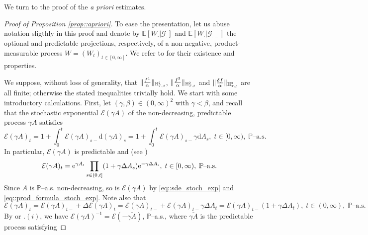 \documentclass[10pt]{article} %
\newcommand\cE{\mathcal E}
\newcommand\cG{\mathcal G}
\newcommand{\smalltext}[1]{\text{\fontsize{4}{4}\selectfont$#1$}}
\def \E{\mathbb{E}}
\def \H{\mathbb{H}}
\def \P{\mathbb{P}}
\newcommand{\1}{\mathbf{1}}
\def\d{\mathrm{d}}
\begin{document}
\medskip
We turn to the proof of the \emph{a priori} estimates.

\begin{proof}[Proof of Proposition \ref{prop::apriori}]\label{proof::apriori}
	To ease the presentation, let us abuse notation sligthly in this proof and denote by $\E[W_\cdot|\cG_\cdot]$ and $\E[W_\cdot|\cG_{\cdot-}]$ the optional and predictable projections, respectively, of a non-negative, product-measurable process $W = (W_t)_{t \in [0,\infty]}$. We refer to \cite[Section VI.2 and Appendix I]{dellacherie1982probabilities} for their existence and properties.
	
	\medskip
	We suppose, without loss of generality, that $\| \frac{f^1}{\alpha}\|_{\H^{\smalltext{2}}_{\smalltext{T}\smalltext{,}\smalltext{\beta}}}$, $\| \frac{f^2}{\alpha}\|_{\H^{\smalltext{2}}_{\smalltext{T}\smalltext{,}\smalltext{\beta}}}$ and $\| \frac{\delta f}{\alpha}\|_{\H^{\smalltext{2}}_{\smalltext{T}\smalltext{,}\smalltext{\beta}}}$ are all finite; otherwise the stated inequalities trivially hold. We start with some introductory calculations. First, let $(\gamma,\beta) \in (0,\infty)^2$ with $\gamma < \beta$, and recall that the stochastic exponential $\cE(\gamma A)$ of the non-decreasing, predictable process $\gamma A$ satisfies
\begin{equation}\label{eq::sde_stoch_exp}
	\cE(\gamma A)_t = 1 + \int_0^t \cE(\gamma A)_{s-}  \d (\gamma A)_s = 1 + \int_0^t \cE(\gamma A)_{s-} \gamma \d A_s, \; t \in [0,\infty), \; \text{$\P$--a.s.}
\end{equation}
In particular, $\cE(\gamma A)$ is predictable and (see \cite[page 134]{jacod2003limit})
\begin{equation}\label{eq::prod_formula_stoch_exp}
	\displaystyle \cE(\gamma A)_t = \mathrm{e}^{\gamma A_\smalltext{t}} \prod_{s \in (0,t]}(1+\gamma\Delta A_s)\mathrm{e}^{-\gamma\Delta A_\smalltext{s}}, \; t \in [0,\infty), \; \text{$\P$--a.s.}
\end{equation}
Since $A$ is $\P$--a.s. non-decreasing, so is $\cE(\gamma A)$ by \eqref{eq::sde_stoch_exp} and \eqref{eq::prod_formula_stoch_exp}. Note also that
\begin{equation}\label{eq::jump_stoch_exp}
	\cE(\gamma A)_t = \cE(\gamma A)_{t-} + \Delta\cE(\gamma A)_t = \cE(\gamma A)_{t-} + \cE(\gamma A)_{t-}\gamma\Delta A_t = \cE(\gamma A)_{t-}(1+\gamma\Delta A_t), \; t \in (0,\infty), \; \text{$\P$--a.s.}
\end{equation}
By \cite[Lemma 4.4]{cohen2012existence} or .$(i)$, we have $\cE(\gamma A)^{-1} = \cE(-\overline{\gamma A})$, $\P$--a.s., where $\overline{\gamma A}$ is the predictable process satisfying

\end{proof}
\end{document}
